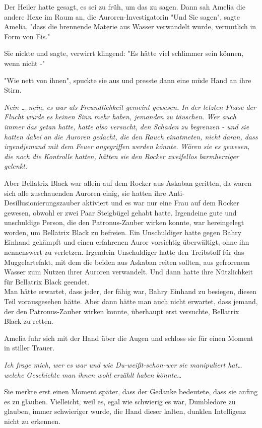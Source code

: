 {Der Heiler hatte gesagt, es sei zu früh, um das zu sagen. Dann sah Amelia die andere Hexe im Raum an, die Auroren-Investigatorin "Und Sie sagen", sagte Amelia, "dass die brennende Materie aus Wasser verwandelt wurde, vermutlich in Form von Eis."

Sie nickte und sagte, verwirrt klingend: "Es hätte viel schlimmer sein können, wenn nicht -"

"Wie nett von ihnen", spuckte sie aus und presste dann eine müde Hand an ihre Stirn.

\emph{Nein … nein, es war als Freundlichkeit gemeint gewesen. In der letzten Phase der Flucht würde es keinen Sinn mehr haben, jemanden zu täuschen. Wer auch immer das getan hatte, hatte also versucht, den Schaden zu begrenzen - und sie hatten dabei an die Auroren gedacht, die den Rauch einatmeten, nicht daran, dass irgendjemand mit dem Feuer angegriffen werden könnte. Wären sie es gewesen, die noch die Kontrolle hatten, hätten sie den Rocker zweifellos barmherziger gelenkt.}

Aber Bellatrix Black war allein auf dem Rocker aus Askaban geritten, da waren sich alle zuschauenden Auroren einig, sie hatten ihre Anti-Desillusionierungszauber aktiviert und es war nur eine Frau auf dem Rocker gewesen, obwohl er zwei Paar Steigbügel gehabt hatte. Irgendeine gute und unschuldige Person, die den Patronus-Zauber wirken konnte, war hereingelegt worden, um Bellatrix Black zu befreien. Ein Unschuldiger hatte gegen Bahry Einhand gekämpft und einen erfahrenen Auror vorsichtig überwältigt, ohne ihn nennenswert zu verletzen. Irgendein Unschuldiger hatte den Treibstoff für das Muggelartefakt, mit dem die beiden aus Askaban reiten sollten, aus gefrorenem Wasser zum Nutzen ihrer Auroren verwandelt. Und dann hatte ihre Nützlichkeit für Bellatrix Black geendet.\\ Man hätte erwartet, dass jeder, der fähig war, Bahry Einhand zu besiegen, diesen Teil vorausgesehen hätte. Aber dann hätte man auch nicht erwartet, dass jemand, der den Patronus-Zauber wirken konnte, überhaupt erst versuchte, Bellatrix Black zu retten.

Amelia fuhr sich mit der Hand über die Augen und schloss sie für einen Moment in stiller Trauer.

\emph{Ich frage mich, wer es war und wie Du-weißt-schon-wer sie manipuliert hat… welche Geschichte man ihnen wohl erzählt haben könnte…}

Sie merkte erst einen Moment später, dass der Gedanke bedeutete, dass sie anfing es zu glauben. Vielleicht, weil es, egal wie schwierig es war, Dumbledore zu glauben, immer schwieriger wurde, die Hand dieser kalten, dunklen Intelligenz nicht zu erkennen.

}
